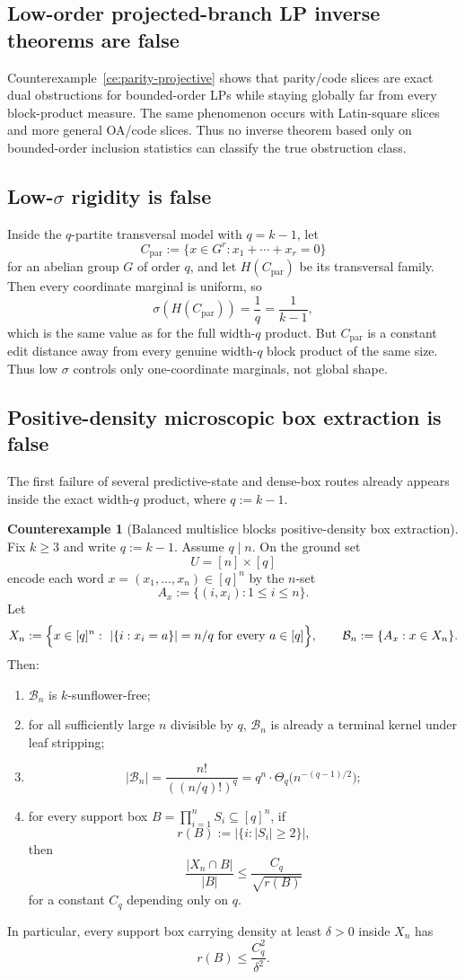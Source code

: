 \documentclass[11pt]{article}
\theoremstyle{definition}
\newtheorem{counterexample}[theorem]{Counterexample}
\newcommand{\1}{\mathbf{1}}
\begin{document}
\subsection{Low-order projected-branch LP inverse theorems are false}
Counterexample~\ref{ce:parity-projective} shows that parity/code slices are exact dual obstructions for bounded-order LPs while staying globally far from every block-product measure. The same phenomenon occurs with Latin-square slices and more general OA/code slices. Thus no inverse theorem based only on bounded-order inclusion statistics can classify the true obstruction class.

\subsection{Low-$\sigma$ rigidity is false}
Inside the $q$-partite transversal model with $q=k-1$, let
\[
C_{\mathrm{par}}:=\{x\in G^r:x_1+\cdots+x_r=0\}
\]
for an abelian group $G$ of order $q$, and let $H(C_{\mathrm{par}})$ be its transversal family. Then every coordinate marginal is uniform, so
\[
\sigma(H(C_{\mathrm{par}}))=\frac{1}{q}=\frac{1}{k-1},
\]
which is the same value as for the full width-$q$ product. But $C_{\mathrm{par}}$ is a constant edit distance away from every genuine width-$q$ block product of the same size. Thus low $\sigma$ controls only one-coordinate marginals, not global shape.

\subsection{Positive-density microscopic box extraction is false}
The first failure of several predictive-state and dense-box routes already appears inside the exact width-$q$ product, where $q:=k-1$.

\begin{counterexample}[Balanced multislice blocks positive-density box extraction]\label{ce:balanced-multislice}
Fix $k\ge 3$ and write $q:=k-1$. Assume $q\mid n$. On the ground set
\[
U=[n]\times [q]
\]
encode each word $x=(x_1,\dots,x_n)\in [q]^n$ by the $n$-set
\[
A_x:=\{(i,x_i):1\le i\le n\}.
\]
Let
\[
X_n:=\Bigl\{x\in [q]^n:\ |\{i:x_i=a\}|=n/q\text{ for every }a\in [q]\Bigr\},
\qquad
\mathcal B_n:=\{A_x:x\in X_n\}.
\]
Then:
\begin{enumerate}[label=(\roman*),leftmargin=2.2em]
\item $\mathcal B_n$ is $k$-sunflower-free;
\item for all sufficiently large $n$ divisible by $q$, $\mathcal B_n$ is already a terminal kernel under leaf stripping;
\item
\[
|\mathcal B_n|=\frac{n!}{((n/q)!)^q}
=
q^n\cdot \Theta_q\bigl(n^{-(q-1)/2}\bigr);
\]
\item for every support box $B=\prod_{i=1}^n S_i\subseteq [q]^n$, if
\[
r(B):=\bigl|\{i:|S_i|\ge 2\}\bigr|,
\]
then
\[
\frac{|X_n\cap B|}{|B|}\le \frac{C_q}{\sqrt{r(B)}}
\]
for a constant $C_q$ depending only on $q$.
\end{enumerate}
In particular, every support box carrying density at least $\delta>0$ inside $X_n$ has
\[
r(B)\le \frac{C_q^2}{\delta^2}.
\]
\end{counterexample}
\end{document}
